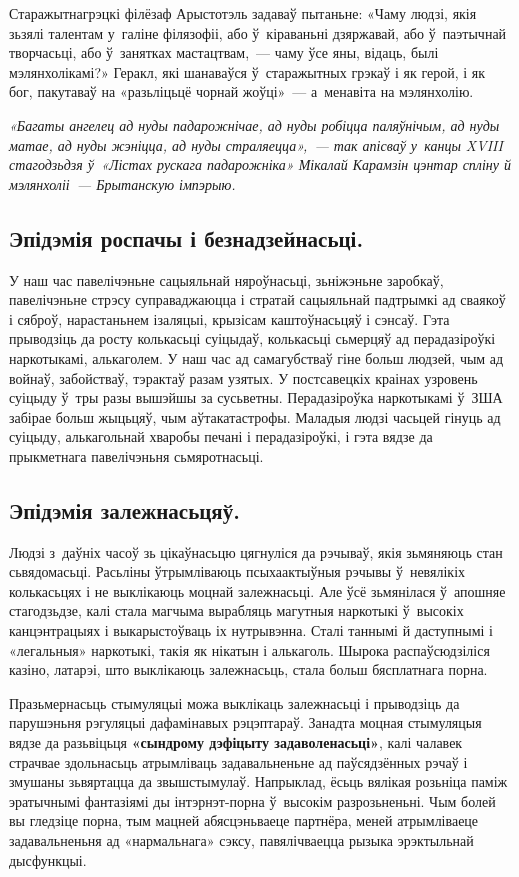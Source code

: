 Старажытнагрэцкі філёзаф Арыстотэль задаваў пытаньне: «Чаму людзі, якія зьзялі талентам у~галіне філязофіі, або ў~кіраваньні дзяржавай, або ў~паэтычнай творчасьці, або ў~занятках мастацтвам,~--- чаму ўсе яны, відаць, былі мэлянхолікамі?» Геракл, які шанаваўся ў~старажытных грэкаў і як герой, і як бог, пакутаваў на «разьліцьцё чорнай жоўці»~--- а~менавіта на мэлянхолію.

\emph{«Багаты ангелец ад нуды падарожнічае, ад нуды робіцца паляўнічым, ад нуды матае, ад нуды жэніцца, ад нуды страляецца»,~--- так апісваў у~канцы XVIII стагодзьдзя ў~«Лістах рускага падарожніка» Мікалай Карамзін цэнтар спліну й мэлянхоліі~--- Брытанскую імпэрыю.}

\subsection*{Эпідэмія роспачы і безнадзейнасьці.} 

У наш час павелічэньне сацыяльнай няроўнасьці, зьніжэньне заробкаў, павелічэньне стрэсу суправаджаюцца і стратай сацыяльнай падтрымкі ад сваякоў і сяброў, нарастаньнем ізаляцыі, крызісам каштоўнасьцяў і сэнсаў. Гэта прыводзіць да росту колькасьці суіцыдаў, колькасьці сьмерцяў ад перадазіроўкі наркотыкамі, алькаголем. У наш час ад самагубстваў гіне больш людзей, чым ад войнаў, забойстваў, тэрактаў разам узятых. У постсавецкіх краінах узровень суіцыду ў~тры разы вышэйшы за сусьветны. Перадазіроўка наркотыкамі ў~ЗША забірае больш жыцьцяў, чым аўтакатастрофы. Маладыя людзі часьцей гінуць ад суіцыду, алькагольнай хваробы печані і перадазіроўкі, і гэта вядзе да прыкметнага павелічэньня сьмяротнасьці.

\subsection*{Эпідэмія залежнасьцяў.} 

Людзі з~даўніх часоў зь цікаўнасьцю цягнуліся да рэчываў, якія зьмяняюць стан сьвядомасьці. Расьліны ўтрымліваюць псыхаактыўныя рэчывы ў~невялікіх колькасьцях і не выклікаюць моцнай залежнасьці. Але ўсё зьмянілася ў~апошняе стагодзьдзе, калі стала магчыма вырабляць магутныя наркотыкі ў~высокіх канцэнтрацыях і выкарыстоўваць іх нутрывэнна. Сталі таннымі й даступнымі і «легальныя» наркотыкі, такія як нікатын і алькаголь. Шырока распаўсюдзіліся казіно, латарэі, што выклікаюць залежнасьць, стала больш бясплатнага порна.

Празьмернасьць стымуляцыі можа выклікаць залежнасьці і прыводзіць да парушэньня рэгуляцыі дафамінавых рэцэптараў. Занадта моцная стымуляцыя вядзе да разьвіцьця \textbf{«сындрому дэфіцыту задаволенасьці»}, калі чалавек страчвае здольнасьць атрымліваць задавальненьне ад паўсядзённых рэчаў і змушаны зьвяртацца да звышстымулаў. Напрыклад, ёсьць вялікая розьніца паміж эратычнымі фантазіямі ды інтэрнэт-порна ў~высокім разрозьненьні. Чым болей вы гледзіце порна, тым мацней абясцэньваеце партнёра, меней атрымліваеце задавальненьня ад «нармальнага» сэксу, павялічваецца рызыка эрэктыльнай дысфункцыі.

